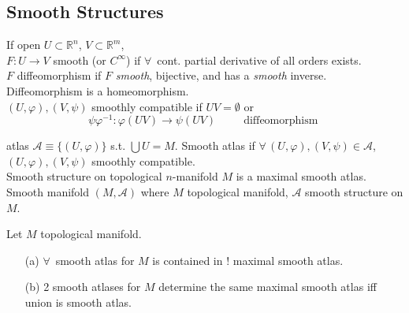 \subsection*{Smooth Structures}

If open $U \subset \mathbb{R}^n$, $V \subset \mathbb{R}^m$, \\
$F:U \to V$ smooth (or $C^{\infty}$) if $\forall \, $ cont. partial derivative of all orders exists.  \\

$F$ diffeomorphism if $F$ \emph{smooth}, bijective, and has a \emph{smooth} inverse.  \\
Diffeomorphism is a homeomorphism.  \\

$(U, \varphi), (V,\psi)$ smoothly compatible if $UV = \emptyset$ or 
\[
\psi \varphi^{-1}: \varphi(UV) \to \psi(UV) \quad \quad \, \text{ diffeomorphism }
\]

atlas $\mathcal{A} \equiv \lbrace (U, \varphi ) \rbrace$ s.t. $\bigcup U = M$.  Smooth atlas if $\forall \, (U,\varphi), (V, \psi) \in \mathcal{A}$, $(U,\varphi), (V,\psi)$ smoothly compatible.  \\

Smooth structure on topological $n$-manifold $M$ is a maximal smooth atlas.   \\

Smooth manifold $(M, \mathcal{A})$ where $M$ topological manifold, $\mathcal{A}$ smooth structure on $M$.   \\


\begin{proposition}[1.17] Let $M$ topological manifold. 
\begin{enumerate}
\item[(a)] $\forall \, $ smooth atlas for $M$ is contained in ! maximal smooth atlas.  
\item[(b)] 2 smooth atlases for $M$ determine the same maximal smooth atlas iff union is smooth atlas.  
\end{enumerate}
\end{proposition}

